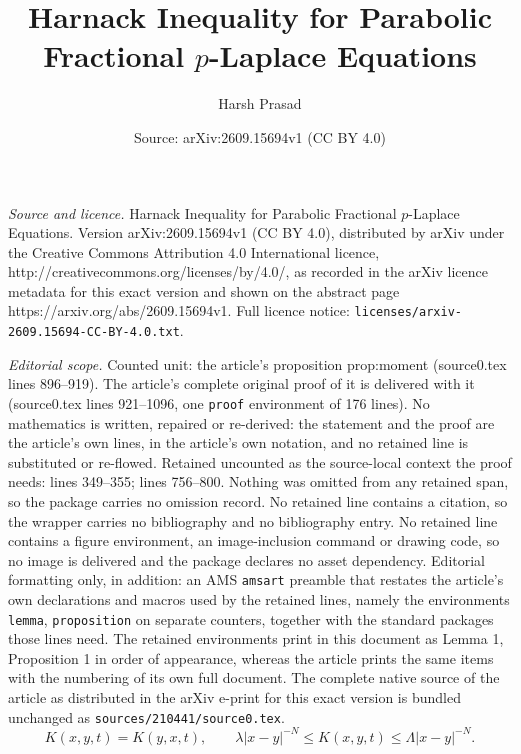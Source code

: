 \documentclass[10pt,a4paper]{amsart}
\title{Harnack Inequality for Parabolic Fractional $p$-Laplace Equations}
\author{Harsh Prasad}
\date{Source: arXiv:2609.15694v1 (CC BY 4.0)}
\begin{document}
\maketitle

\noindent\emph{Source and licence.} Harnack Inequality for Parabolic Fractional $p$-Laplace Equations. Version arXiv:2609.15694v1 (CC BY 4.0), distributed by arXiv under the Creative Commons Attribution 4.0 International licence, http://creativecommons.org/licenses/by/4.0/, as recorded in the arXiv licence metadata for this exact version and shown on the abstract page https://arxiv.org/abs/2609.15694v1. Full licence notice: \texttt{licenses/arxiv-2609.15694-CC-BY-4.0.txt}.\par\smallskip

\noindent\textit{Editorial scope.} Counted unit: the article's proposition prop:moment (source0.tex lines 896--919). The article's complete original proof of it is delivered with it (source0.tex lines 921--1096, one \texttt{proof} environment of 176 lines). No mathematics is written, repaired or re-derived: the statement and the proof are the article's own lines, in the article's own notation, and no retained line is substituted or re-flowed.  Retained uncounted as the source-local context the proof needs: lines 349--355; lines 756--800.  Nothing was omitted from any retained span, so the package carries no omission record.  No retained line contains a citation, so the wrapper carries no bibliography and no bibliography entry.  No retained line contains a figure environment, an image-inclusion command or drawing code, so no image is delivered and the package declares no asset dependency.  Editorial formatting only, in addition: an AMS \texttt{amsart} preamble that restates the article's own declarations and macros used by the retained lines, namely the environments \texttt{lemma}, \texttt{proposition} on separate counters, together with the standard packages those lines need.  The retained environments print in this document as Lemma 1, Proposition 1 in order of appearance, whereas the article prints the same items with the numbering of its own full document.  The complete native source of the article as distributed in the arXiv e-print for this exact version is bundled unchanged as \texttt{sources/210441/source0.tex}.
\begin{equation}\label{eq:kernel}
K(x,y,t)=K(y,x,t),
\qquad
\lambda |x-y|^{-N}
\le K(x,y,t)
\le \Lambda |x-y|^{-N}.
\end{equation}
\end{document}
